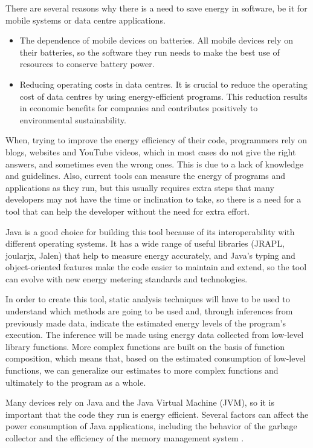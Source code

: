 \documentclass[sigplan]{acmart}
\begin{document}
There are several reasons why there is a need to save energy in software, be it for mobile systems or data centre applications. \\

\begin{itemize}
  \item The dependence of mobile devices on batteries. All mobile devices rely on their batteries, so the software they run needs to make the best use of resources to conserve battery power.
  \item Reducing operating costs in data centres. It is crucial to reduce the operating cost of data centres by using energy-efficient programs. This reduction results in economic benefits for companies and contributes positively to environmental sustainability. \\
\end{itemize}

When, trying to improve the energy efficiency of their code, programmers rely on blogs, websites and YouTube videos, which in most cases do not give the right answers, and sometimes even the wrong ones. This is due to a lack of knowledge and guidelines.
Also, current tools can measure the energy of programs and applications as they run, but this usually requires extra steps that many developers may not have the time or inclination to take, so there is a need for a tool that can help the developer without the need for extra effort\cite{10.1145/3154384}. 

Java is a good choice for building this tool because of its interoperability with different operating systems. It has a wide range of useful libraries (JRAPL, joularjx, Jalen) that help to measure energy accurately, and Java's typing and object-oriented features make the code easier to maintain and extend, so the tool can evolve with new energy metering standards and technologies. 

In order to create this tool, static analysis techniques will have to be used to understand which methods are going to be used and, through inferences from previously made data, indicate the estimated energy levels of the program's execution. The inference will be made using energy data collected from low-level library functions. More complex functions are built on the basis of function composition, which means that, based on the estimated consumption of low-level functions, we can generalize our estimates to more complex functions and ultimately to the program as a whole. 

Many devices rely on Java and the Java Virtual Machine (JVM), so it is important that the code they run is energy efficient. Several factors can affect the power consumption of Java applications, including the behavior of the garbage collector and the efficiency of the memory management system \cite{10.5555/1267847.1267870}. 
\end{document}
